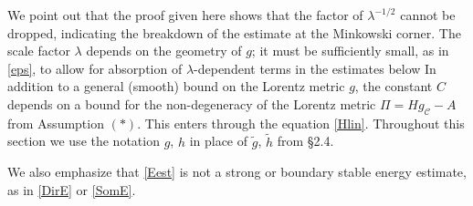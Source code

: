 \documentclass[10pt]{amsart}
\renewcommand{\l}{\lambda}
\newcommand{\cC}{{\mathcal C}}
\newcommand{\<}{\langle}
\renewcommand{\>}{\rangle}
\newcommand{\w}{\widetilde}
\theoremstyle{plain}
\theoremstyle{remark}
\theoremstyle{definition}
\numberwithin{equation}{section}
\begin{document}
We point out that the proof given here shows that the factor of $\l^{-1/2}$ cannot be dropped, indicating the breakdown of the estimate at the 
Minkowski corner. The scale factor $\l$ depends on the geometry of $g$; it must be sufficiently small, as in \eqref{eps}, to allow for absorption of 
$\l$-dependent terms in the estimates below In addition to a general (smooth) bound on the Lorentz metric $g$, the constant $C$ depends on a 
bound for the non-degeneracy of the Lorentz metric $\Pi = Hg_{\cC} - A$ from Assumption $(*)$. This enters through the equation \eqref{Hlin}. 
Throughout this section we use the notation $g$, $h$ in place of $\w g$, $\w h$ from \S 2.4. 

  We also emphasize that \eqref{Eest} is not a strong or boundary stable energy estimate, as in \eqref{DirE} or \eqref{SomE}. 
 
\end{document}
